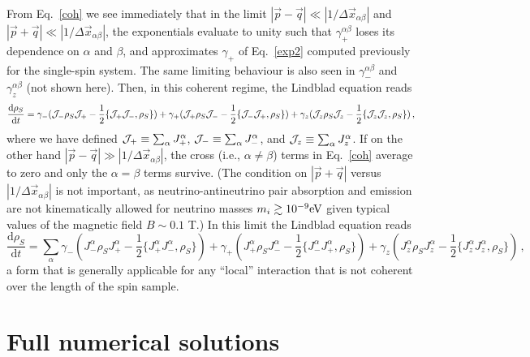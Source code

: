 \documentclass[aps,prd,10pt,twocolumn,superscriptaddress,floatfix,nofootinbib,amsmath,amssymb,altaffilletter,preprintnumbers]{revtex4-1}
\begin{document}
From Eq.~\eqref{coh} we see immediately that in the limit  $|\vec{p}-\vec{q}|\ll|1/\Delta\vec{x}_{\alpha \beta}|$ and $|\vec{p}+\vec{q}|\ll|1/\Delta\vec{x}_{\alpha \beta}|$,
the exponentials evaluate to unity such that $\gamma^{\alpha \beta}_{+}$ loses its dependence on $\alpha$ and $\beta$, and  approximates $\gamma_{+}$ of Eq.~\eqref{exp2} computed previously for the single-spin system.  The same limiting behaviour is also seen in $\gamma_{-}^{\alpha \beta}$ and $\gamma_{z}^{\alpha \beta}$ (not shown here).  Then, in this coherent regime, the Lindblad equation reads
\begin{equation}
\frac{\mathrm{d} \rho_S}{\mathrm{d}t} = \gamma_{-}({\cal J}_- \rho_S {\cal J}_+ - \frac{1}{2} \{{\cal J}_+ {\cal J}_-,\rho_S\} ) 
+ \gamma_{+}({\cal J}_+ \rho_S {\cal J}_- - \frac{1}{2} \{{\cal J}_- {\cal J}_+,\rho_S\} )
+ \gamma_{z}({\cal J}_z \rho_S {\cal J}_z - \frac{1}{2} \{{\cal J}_z {\cal J}_z,\rho_S\} )\, ,
\end{equation}
where we have defined ${\cal J}_+ \equiv \sum_\alpha J^{\alpha}_+$, ${\cal J}_-\equiv \sum_\alpha J^{\alpha}_-$, and ${\cal J}_z \equiv \sum_\alpha J^{\alpha}_z$.
If on the other hand $|\vec{p}-\vec{q}|\gg|1/\Delta\vec{x}_{\alpha \beta}|$,
the cross (i.e., $\alpha \neq \beta$) terms in Eq.~\eqref{coh} average to zero and only the  $\alpha=\beta$ terms survive.  (The condition on $|\vec{p}+\vec{q}|$ versus $|1/\Delta\vec{x}_{\alpha \beta}|$ is not important, as neutrino-antineutrino pair absorption and emission are not kinematically allowed for neutrino masses $m_i\gtrsim10^{-9} \rm eV$ given typical values of the magnetic field $B\sim 0.1$ T.)
In this limit the Lindblad equation reads
\begin{equation}
\frac{\mathrm{d} \rho_S}{\mathrm{d}t} = 
\sum_{\alpha }\gamma_{-}(J^\alpha_- \rho_S J^\alpha_+ - \frac{1}{2} \{J^\alpha_+ J^\alpha_-,\rho_S\} ) 
 + \gamma_{+}(J^\alpha_+ \rho_S J^\alpha_- - \frac{1}{2} \{J^\alpha_- J^\alpha_+,\rho_S\} )
 + \gamma_{z}(J^\alpha_z \rho_S J^\alpha_z - \frac{1}{2} \{J^\alpha_z J^\alpha_z,\rho_S\} )\,,
\end{equation}
a form that is generally applicable for any ``local'' interaction that is not coherent over the length of the spin sample. 




\section{Full numerical solutions}\label{sec:fullsol}
\end{document}
